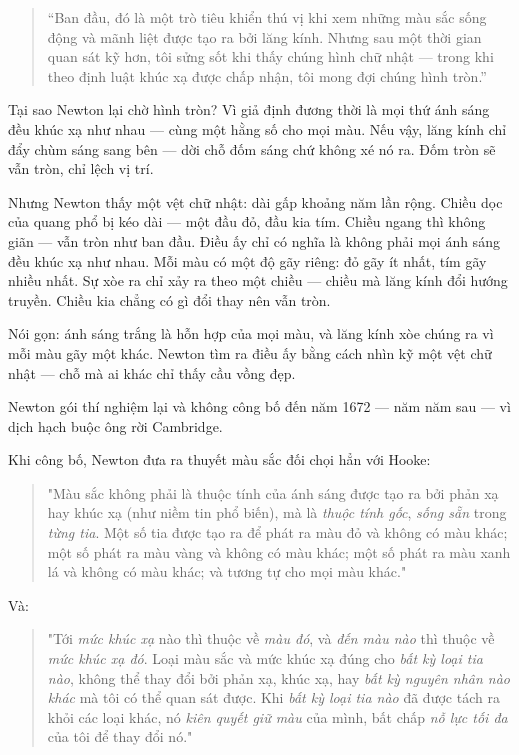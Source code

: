 \begin{quote}
“Ban đầu, đó là một trò tiêu khiển thú vị khi xem những màu sắc sống động và mãnh liệt được tạo ra bởi lăng kính. Nhưng sau một thời gian quan sát kỹ hơn, tôi sửng sốt khi thấy chúng hình chữ nhật — trong khi theo định luật khúc xạ được chấp nhận, tôi mong đợi chúng hình tròn.”
\end{quote}

Tại sao Newton lại chờ hình tròn? Vì giả định đương thời là mọi thứ ánh sáng đều khúc xạ như nhau — cùng một hằng số cho mọi màu. Nếu vậy, lăng kính chỉ đẩy chùm sáng sang bên — dời chỗ đốm sáng chứ không xé nó ra. Đốm tròn sẽ vẫn tròn, chỉ lệch vị trí.

Nhưng Newton thấy một vệt chữ nhật: dài gấp khoảng năm lần rộng. Chiều dọc của quang phổ bị kéo dài — một đầu đỏ, đầu kia tím. Chiều ngang thì không giãn — vẫn tròn như ban đầu. Điều ấy chỉ có nghĩa là không phải mọi ánh sáng đều khúc xạ như nhau. Mỗi màu có một độ gãy riêng: đỏ gãy ít nhất, tím gãy nhiều nhất. Sự xòe ra chỉ xảy ra theo một chiều — chiều mà lăng kính đổi hướng truyền. Chiều kia chẳng có gì đổi thay nên vẫn tròn.

Nói gọn: ánh sáng trắng là hỗn hợp của mọi màu, và lăng kính xòe chúng ra vì mỗi màu gãy một khác. Newton tìm ra điều ấy bằng cách nhìn kỹ một vệt chữ nhật — chỗ mà ai khác chỉ thấy cầu vồng đẹp.

Newton gói thí nghiệm lại và không công bố đến năm 1672 — năm năm sau — vì dịch hạch buộc ông rời Cambridge.

Khi công bố, Newton đưa ra thuyết màu sắc đối chọi hẳn với Hooke:

\begin{quote}
"Màu sắc không phải là thuộc tính của ánh sáng được tạo ra bởi phản xạ hay khúc xạ (như niềm tin phổ biến), mà là \emph{thuộc tính gốc}, \emph{sống sẵn} trong \emph{từng tia}. Một số tia được tạo ra để phát ra màu đỏ và không có màu khác; một số phát ra màu vàng và không có màu khác; một số phát ra màu xanh lá và không có màu khác; và tương tự cho mọi màu khác."
\end{quote}

Và:

\begin{quote}
"Tới \emph{mức khúc xạ} nào thì thuộc về \emph{màu đó}, và \emph{đến màu nào} thì thuộc về \emph{mức khúc xạ đó}. Loại màu sắc và mức khúc xạ đúng cho \emph{bất kỳ loại tia nào}, không thể thay đổi bởi phản xạ, khúc xạ, hay \emph{bất kỳ nguyên nhân nào khác} mà tôi có thể quan sát được. Khi \emph{bất kỳ loại tia nào} đã được tách ra khỏi các loại khác, nó \emph{kiên quyết giữ màu} của mình, bất chấp \emph{nỗ lực tối đa} của tôi để thay đổi nó."
\end{quote}

